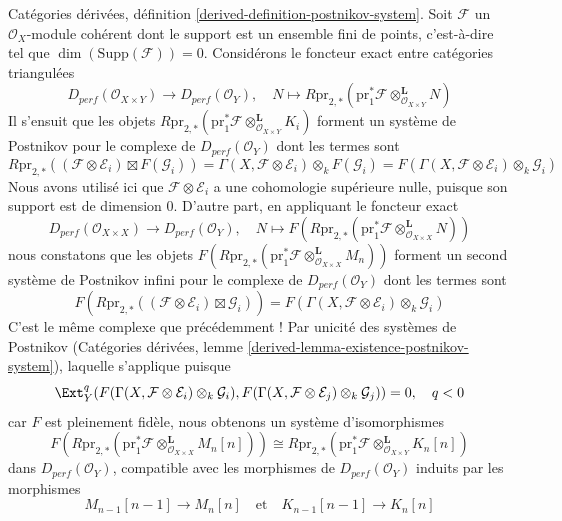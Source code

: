 Catégories dérivées, définition \ref{derived-definition-postnikov-system}.
\medskip\noindent
Soit $\mathcal{F}$ un $\mathcal{O}_X$-module cohérent dont le support
est un ensemble fini de points, c'est-à-dire tel que $\dim(\text{Supp}(\mathcal{F})) = 0$.
Considérons le foncteur exact entre catégories triangulées
$$
D_{perf}(\mathcal{O}_{X \times Y})
\longrightarrow
D_{perf}(\mathcal{O}_Y),\quad
N \longmapsto R\text{pr}_{2, *}(\text{pr}_1^*\mathcal{F}
\otimes^\mathbf{L}_{\mathcal{O}_{X \times Y}} N)
$$
Il s'ensuit que les objets $R\text{pr}_{2, *}(\text{pr}_1^*\mathcal{F}
\otimes^\mathbf{L}_{\mathcal{O}_{X \times Y}} K_i)$
forment un système de Postnikov pour le complexe de
$D_{perf}(\mathcal{O}_Y)$ dont les termes sont
$$
R\text{pr}_{2, *}(
(\mathcal{F} \otimes \mathcal{E}_i) \boxtimes F(\mathcal{G}_i)) =
\Gamma(X, \mathcal{F} \otimes \mathcal{E}_i) \otimes_k F(\mathcal{G}_i) =
F(\Gamma(X, \mathcal{F} \otimes \mathcal{E}_i) \otimes_k \mathcal{G}_i)
$$
Nous avons utilisé ici que $\mathcal{F} \otimes \mathcal{E}_i$ a une
cohomologie supérieure nulle, puisque son support est de dimension $0$.
D'autre part, en appliquant le foncteur exact
$$
D_{perf}(\mathcal{O}_{X \times X})
\longrightarrow
D_{perf}(\mathcal{O}_Y),\quad
N \longmapsto F(R\text{pr}_{2, *}(\text{pr}_1^*\mathcal{F}
\otimes^\mathbf{L}_{\mathcal{O}_{X \times X}} N))
$$
nous constatons que les objets
$F(R\text{pr}_{2, *}(\text{pr}_1^*\mathcal{F}
\otimes^\mathbf{L}_{\mathcal{O}_{X \times X}} M_n))$
forment un second système de Postnikov infini
pour le complexe de $D_{perf}(\mathcal{O}_Y)$ dont les termes sont
$$
F(R\text{pr}_{2, *}(
(\mathcal{F} \otimes \mathcal{E}_i) \boxtimes \mathcal{G}_i)) =
F(\Gamma(X, \mathcal{F} \otimes \mathcal{E}_i) \otimes_k \mathcal{G}_i)
$$
C'est le même complexe que précédemment ! Par unicité des systèmes de Postnikov
(Catégories dérivées, lemme \ref{derived-lemma-existence-postnikov-system}),
laquelle s'applique puisque
$$
\Ext^q_Y(
F(\Gamma(X, \mathcal{F} \otimes \mathcal{E}_i) \otimes_k \mathcal{G}_i),
F(\Gamma(X, \mathcal{F} \otimes \mathcal{E}_j) \otimes_k \mathcal{G}_j)) = 0,
\quad q < 0
$$
car $F$ est pleinement fidèle, nous obtenons un système d'isomorphismes
$$
F(R\text{pr}_{2, *}(\text{pr}_1^*\mathcal{F}
\otimes^\mathbf{L}_{\mathcal{O}_{X \times X}} M_n[n]))
\cong
R\text{pr}_{2, *}(\text{pr}_1^*\mathcal{F}
\otimes^\mathbf{L}_{\mathcal{O}_{X \times Y}} K_n[n])
$$
dans $D_{perf}(\mathcal{O}_Y)$, compatible avec les morphismes de
$D_{perf}(\mathcal{O}_Y)$ induits par les morphismes
$$
M_{n - 1}[n - 1] \to M_n[n]
\quad\text{et}\quad
K_{n - 1}[n - 1] \to K_n[n]
$$

